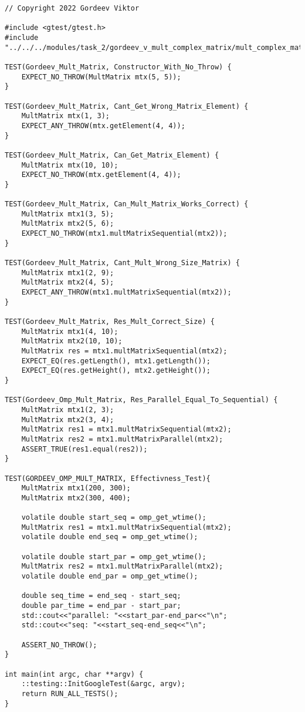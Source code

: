 \documentclass{report}
\begin{document}
\begin{lstlisting}
// Copyright 2022 Gordeev Viktor

#include <gtest/gtest.h>
#include "../../../modules/task_2/gordeev_v_mult_complex_matrix/mult_complex_matrix.h"

TEST(Gordeev_Mult_Matrix, Constructor_With_No_Throw) {
    EXPECT_NO_THROW(MultMatrix mtx(5, 5));
}

TEST(Gordeev_Mult_Matrix, Cant_Get_Wrong_Matrix_Element) {
    MultMatrix mtx(1, 3);
    EXPECT_ANY_THROW(mtx.getElement(4, 4));
}

TEST(Gordeev_Mult_Matrix, Can_Get_Matrix_Element) {
    MultMatrix mtx(10, 10);
    EXPECT_NO_THROW(mtx.getElement(4, 4));
}

TEST(Gordeev_Mult_Matrix, Can_Mult_Matrix_Works_Correct) {
    MultMatrix mtx1(3, 5);
    MultMatrix mtx2(5, 6);
    EXPECT_NO_THROW(mtx1.multMatrixSequential(mtx2));
}

TEST(Gordeev_Mult_Matrix, Cant_Mult_Wrong_Size_Matrix) {
    MultMatrix mtx1(2, 9);
    MultMatrix mtx2(4, 5);
    EXPECT_ANY_THROW(mtx1.multMatrixSequential(mtx2));
}

TEST(Gordeev_Mult_Matrix, Res_Mult_Correct_Size) {
    MultMatrix mtx1(4, 10);
    MultMatrix mtx2(10, 10);
    MultMatrix res = mtx1.multMatrixSequential(mtx2);
    EXPECT_EQ(res.getLength(), mtx1.getLength());
    EXPECT_EQ(res.getHeight(), mtx2.getHeight());
}

TEST(Gordeev_Omp_Mult_Matrix, Res_Parallel_Equal_To_Sequential) {
    MultMatrix mtx1(2, 3);
    MultMatrix mtx2(3, 4);
    MultMatrix res1 = mtx1.multMatrixSequential(mtx2);
    MultMatrix res2 = mtx1.multMatrixParallel(mtx2);
    ASSERT_TRUE(res1.equal(res2));
}

TEST(GORDEEV_OMP_MULT_MATRIX, Effectivness_Test){
    MultMatrix mtx1(200, 300);
    MultMatrix mtx2(300, 400);

    volatile double start_seq = omp_get_wtime();
    MultMatrix res1 = mtx1.multMatrixSequential(mtx2);
    volatile double end_seq = omp_get_wtime();

    volatile double start_par = omp_get_wtime();
    MultMatrix res2 = mtx1.multMatrixParallel(mtx2);
    volatile double end_par = omp_get_wtime();

    double seq_time = end_seq - start_seq;
    double par_time = end_par - start_par;
    std::cout<<"parallel: "<<start_par-end_par<<"\n";
    std::cout<<"seq: "<<start_seq-end_seq<<"\n";

    ASSERT_NO_THROW();
}

int main(int argc, char **argv) {
    ::testing::InitGoogleTest(&argc, argv);
    return RUN_ALL_TESTS();
}


\end{lstlisting}
\end{document}
